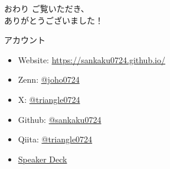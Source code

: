 \documentclass[aspectratio=169, dvipdfmx, 11pt]{beamer} %
\begin{document}
\begin{frame}{おわり}
    \centering
    \Huge
    ご覧いただき、\\ありがとうございました！\\
    \vspace{0.5cm} %
    \normalsize
    \begin{flushleft}
    アカウント
    \begin{itemize}
        \item Website: \href{https://sankaku0724.github.io/}{https://sankaku0724.github.io/}
        \item Zenn: \href{https://zenn.dev/joho0724}{@joho0724}
        \item X: \href{https://twitter.com/triangle0724}{@triangle0724}
        \item Github: \href{https://github.com/sankaku0724}{@sankaku0724}
        \item Qiita: \href{https://qiita.com/triangle0724}{@triangle0724}
        \item \href{https://speakerdeck.com/sankaku0724}{Speaker Deck}
    \end{itemize}
\end{flushleft}
\end{frame}
\end{document}
